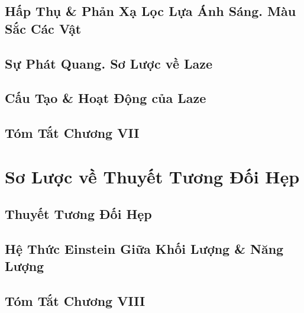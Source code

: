\documentclass{article}
\numberwithin{equation}{section}
\begin{document}

\subsection{Hấp Thụ \& Phản Xạ Lọc Lựa Ánh Sáng. Màu Sắc Các Vật}


\subsection{Sự Phát Quang. Sơ Lược về Laze}


\subsection{Cấu Tạo \& Hoạt Động của Laze}


\subsection{Tóm Tắt Chương VII}


\section{Sơ Lược về Thuyết Tương Đối Hẹp}

\subsection{Thuyết Tương Đối Hẹp}


\subsection{Hệ Thức Einstein Giữa Khối Lượng \& Năng Lượng}


\subsection{Tóm Tắt Chương VIII}
\end{document}

